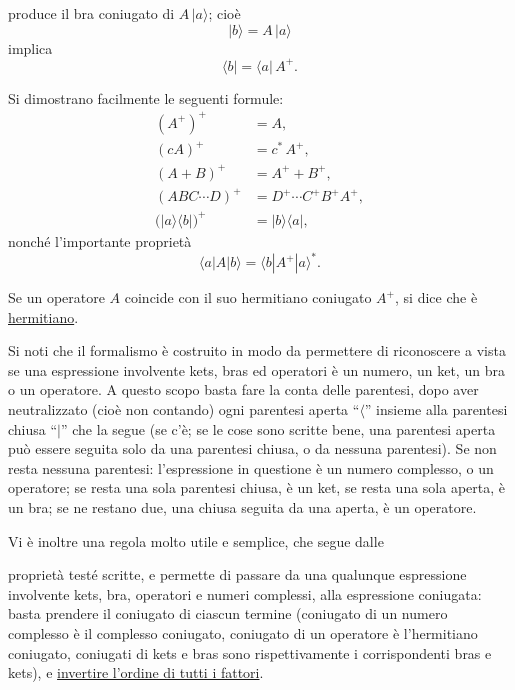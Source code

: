 \documentclass[11pt, a4paper]{book}
\numberwithin{equation}{section}
\begin{document}

produce il bra coniugato di $A\,|a\rangle$; cioè
\begin{equation}
|b\rangle = A\,|a\rangle \tag{14a}
\end{equation}
implica
\begin{equation}
\langle b| = \langle a|\,A^+. \tag{14b}
\end{equation}

Si dimostrano facilmente le seguenti formule:
\begin{align}
(A^+)^+ &= A, \tag{15a} \\
(cA)^+ &= c^*\,A^+, \tag{15b} \\
(A+B)^+ &= A^+ + B^+, \tag{15c} \\
(ABC\cdots D)^+ &= D^+\cdots C^+B^+A^+, \tag{15d} \\
\bigl(|a\rangle\langle b|\bigr)^+ &= |b\rangle\langle a|, \tag{15e}
\end{align}
nonché l'importante proprietà
\begin{equation}
\langle a|A|b\rangle = \langle b|A^+|a\rangle^*.
\end{equation}

Se un operatore $A$ coincide con il suo hermitiano coniugato $A^+$, si
dice che è \uline{hermitiano}.

Si noti che il formalismo è costruito in modo da permettere di
riconoscere a vista se una espressione involvente kets, bras ed operatori
è un numero, un ket, un bra o un operatore. A questo scopo basta fare la
conta delle parentesi, dopo aver neutralizzato (cioè non contando) ogni
parentesi aperta ``$\langle$'' insieme alla parentesi chiusa ``$|$'' che
la segue (se c'è; se le cose sono scritte bene, una parentesi aperta può
essere seguita solo da una parentesi chiusa, o da nessuna parentesi). Se
non resta nessuna parentesi: l'espressione in questione è un numero
complesso, o un operatore; se resta una sola parentesi chiusa, è un ket,
se resta una sola aperta, è un bra; se ne restano due, una chiusa seguita
da una aperta, è un operatore.

Vi è inoltre una regola molto utile e semplice, che segue dalle


proprietà testé scritte, e permette di passare da una qualunque
espressione involvente kets, bra, operatori e numeri complessi, alla
espressione coniugata: basta prendere il coniugato di ciascun termine
(coniugato di un numero complesso è il complesso coniugato, coniugato di
un operatore è l'hermitiano coniugato, coniugati di kets e bras sono
rispettivamente i corrispondenti bras e kets), e \uline{invertire
l'ordine di tutti i fattori}.
\end{document}
